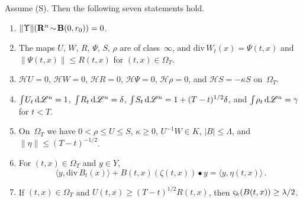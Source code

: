 \documentclass[a4paper,twoside,leqno]{article}
\newcommand{\heatop}{\mathcal{H}}          %
\newcommand{\sv}[1]{\varsigma_{#1}}        %
\begin{document}
\begin{lemma}
    \label{lem:identities}
    Assume (S). Then the following seven statements hold.
    \begin{enumerate}
        \item \label{i:id:spt} $\|\Upsilon\|(\mathbf{R}^{n} \!\sim\! \mathbf{B}(0,r_0)) = 0$.
        \item \label{i:id:div} The maps $U$, $W$, $R$, $\Psi$, $S$, $\rho$ are of class~$\infty$,
        and $\mathrm{div}\, W_t(x) = \Psi(t,x)$ and $\|\Psi(t,x)\| \le R(t,x)$ for $(t,x) \in
        \Omega_T$.
        \item \label{i:id:heat} $\heatop U = 0$, $\heatop W = 0$, $\heatop R = 0$, $\heatop \Psi =
        0$, $\heatop \rho = 0$, and $\heatop S = - \kappa S$ on~$\Omega_T$.
        \item \label{i:id:mass} ${\textstyle\int_{}^{}} U_t \,\mathrm{d} \mathscr{L}^{n} = 1$, ${\textstyle\int_{}^{}} R_t \,\mathrm{d}
        \mathscr{L}^{n} = \delta$, ${\textstyle\int_{}^{}} S_t \,\mathrm{d} \mathscr{L}^{n} = 1 + (T-t)^{1/2} \delta$, and
        ${\textstyle\int_{}^{}} \rho_t \,\mathrm{d} \mathscr{L}^{n} = \gamma$ for $t < T$.
        \item \label{i:id:bounds} On~$\Omega_T$ we have $0 < \rho \le U \le S$, $\kappa \ge 0$,
        $U^{-1} W \in K$, $|B| \le \Lambda$, and $\|\eta\| \le (T-t)^{-1/2}$.
        \item \label{i:id:divB} For $(t,x) \in \Omega_T$ and $y \in Y$,
        \begin{displaymath}
            \langle y, \mathrm{div}\, B_t(x) \rangle + B(t,x)(\zeta(t,x)) \bullet y = \langle y,
            \eta(t,x) \rangle \,.
        \end{displaymath}
        \item \label{i:id:sv} If $(t,x) \in \Omega_T$ and $U(t,x) \ge (T-t)^{1/2} R(t,x)$, then
        $\sv{\vdim}(B(t,x)) \ge \lambda/2$.
    \end{enumerate}
\end{lemma}
\end{document}
